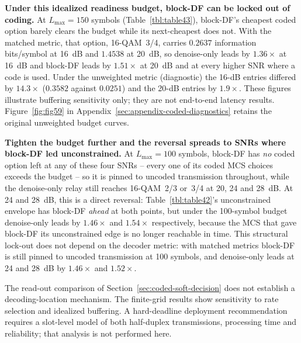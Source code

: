 \textbf{Under this idealized readiness budget, block-DF can be locked out of coding.} At $L_{\max}=150$ symbols (Table~\ref{tbl:table43}), block-DF's cheapest coded option barely clears the budget while its next-cheapest does not. With the matched metric, that option, 16-QAM~3/4, carries $0.2637$ information bits/symbol at 16~dB and $1.4538$ at 20~dB, so denoise-only leads by $1.36\times$ at 16~dB and block-DF leads by $1.51\times$ at 20~dB and at every higher SNR where a code is used. Under the unweighted metric (diagnostic) the 16-dB entries differed by $14.3\times$ ($0.3582$ against $0.0251$) and the 20-dB entries by $1.9\times$. These figures illustrate buffering sensitivity only; they are not end-to-end latency results. Figure~\ref{fig:fig59} in Appendix~\ref{sec:appendix-coded-diagnostics} retains the original unweighted budget curves.

\textbf{Tighten the budget further and the reversal spreads to SNRs where block-DF led unconstrained.} At $L_{\max}=100$ symbols, block-DF has \emph{no} coded option left at any of these four SNRs -- every one of its coded MCS choices exceeds the budget -- so it is pinned to uncoded transmission throughout, while the denoise-only relay still reaches 16-QAM~2/3 or~3/4 at 20, 24 and 28~dB. At 24 and 28~dB, this is a direct reversal: Table~\ref{tbl:table42}'s unconstrained envelope has block-DF \emph{ahead} at both points, but under the 100-symbol budget denoise-only leads by $1.46\times$ and $1.54\times$ respectively, because the MCS that gave block-DF its unconstrained edge is no longer reachable in time. This structural lock-out does not depend on the decoder metric: with matched metrics block-DF is still pinned to uncoded transmission at 100 symbols, and denoise-only leads at 24 and 28~dB by $1.46\times$ and $1.52\times$.

The read-out comparison of Section~\ref{sec:coded-soft-decision} does not establish a decoding-location mechanism. The finite-grid results show sensitivity to rate selection and idealized buffering. A hard-deadline deployment recommendation requires a slot-level model of both half-duplex transmissions, processing time and reliability; that analysis is not performed here.
